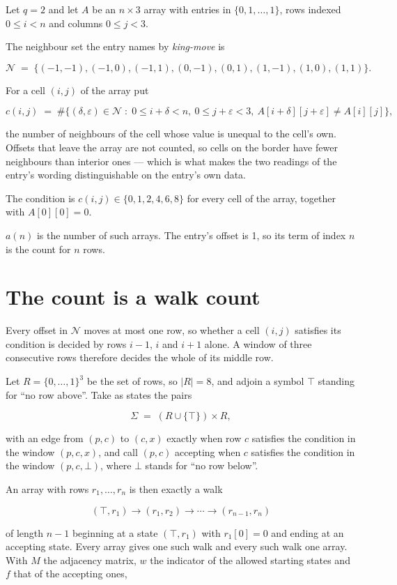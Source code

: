 \documentclass[11pt]{article}
\theoremstyle{definition}
\begin{document}
Let $q = 2$ and let $A$ be an $n \times 3$ array with entries in $\{0,1,\dots,1\}$, rows indexed $0 \le i < n$ and columns $0 \le j < 3$.

The neighbour set the entry names by {\itshape king-move} is

\[\mathcal{N} \;=\; \{(-1,-1), (-1,0), (-1,1), (0,-1), (0,1), (1,-1), (1,0), (1,1)\}.\]

For a cell $(i,j)$ of the array put

\[c(i,j) \;=\; \#\bigl\{(\delta,\varepsilon)\in\mathcal{N} \;:\; 0\le i+\delta<n,\ 0\le j+\varepsilon<3,\ A[i+\delta][j+\varepsilon] \neq A[i][j]\bigr\},\]

the number of neighbours of the cell whose value is unequal to the cell's own. Offsets that leave the array are not counted, so cells on the border have fewer neighbours than interior ones --- which is what makes the two readings of the entry's wording distinguishable on the entry's own data.

The condition is $c(i,j) \in \{0, 1, 2, 4, 6, 8\}$ for every cell of the array, together with $A[0][0]=0$.

$a(n)$ is the number of such arrays. The entry's offset is 1, so its term of index $n$ is the count for $n$ rows.

\section{The count is a walk count}

Every offset in $\mathcal{N}$ moves at most one row, so whether a cell $(i,j)$ satisfies its condition is decided by rows $i-1$, $i$ and $i+1$ alone. A window of three consecutive rows therefore decides the whole of its middle row.

Let $R = \{0,\dots,1\}^{3}$ be the set of rows, so $|R| = 8$, and adjoin a symbol $\top$ standing for ``no row above''. Take as states the pairs

\[\Sigma \;=\; (R \cup \{\top\}) \times R,\]

with an edge from $(p,c)$ to $(c,x)$ exactly when row $c$ satisfies the condition in the window $(p,c,x)$, and call $(p,c)$ accepting when $c$ satisfies the condition in the window $(p,c,\bot)$, where $\bot$ stands for ``no row below''.

An array with rows $r_1,\dots,r_n$ is then exactly a walk

\[(\top,r_1) \to (r_1,r_2) \to \cdots \to (r_{n-1},r_n)\]

of length $n-1$ beginning at a state $(\top,r_1)$ with $r_1[0]=0$ and ending at an accepting state. Every array gives one such walk and every such walk one array. With $M$ the adjacency matrix, $w$ the indicator of the allowed starting states and $f$ that of the accepting ones,
\end{document}
